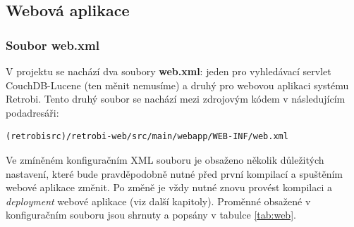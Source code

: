 \subsection{Webová aplikace}

\subsubsection{Soubor web.xml}

V projektu se nachází dva soubory {\bf web.xml}: jeden pro vyhledávací servlet CouchDB-Lucene (ten měnit nemusíme) a druhý pro webovou aplikaci systému Retrobi. Tento druhý soubor se nachází mezi zdrojovým kódem v následujícím podadresáři:

\begin{verbatim}
(retrobisrc)/retrobi-web/src/main/webapp/WEB-INF/web.xml
\end{verbatim}

Ve zmíněném konfiguračním XML souboru je obsaženo několik důležitých nastavení, které bude pravděpodobně nutné před první kompilací a spuštěním webové aplikace změnit. Po změně je vždy nutné znovu provést kompilaci a {\em deployment} webové aplikace (viz další kapitoly). Proměnné obsažené v konfiguračním souboru jsou shrnuty a popsány v tabulce \ref{tab:web}.

